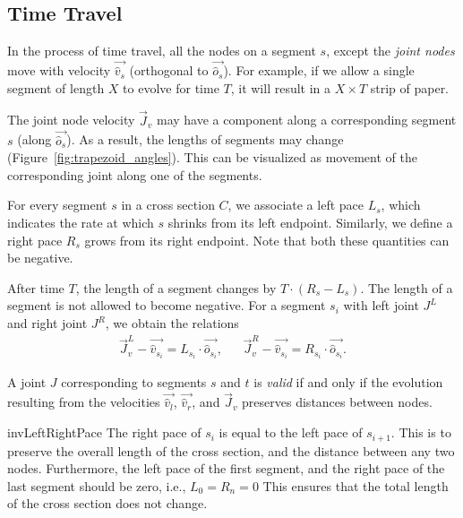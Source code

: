 \subsection{Time Travel}
\label{sec:time_travel}

In the process of time travel, all the nodes on a segment $s$, except the
\emph{joint nodes} move with velocity $\vec{\hat v_s}$ (orthogonal to $\vec{\hat
o_s}$). For example, if we allow a single segment of length $X$ to evolve for
time $T$, it will result in a $X\times T$ strip of paper.

The joint node velocity $\vec J_v$ may have a component along a corresponding
segment $s$ (along $\vec{\hat o_s}$). As a result, the lengths of segments may
change (Figure~\ref{fig:trapezoid_angles}). This can be visualized as movement
of the corresponding joint along one of the segments.

\begin{definition}
\label{def:segment_length}
For every segment $s$ in a cross section $C$, we associate a left pace $L_s$,
which indicates the rate at which $s$ shrinks from its left endpoint.
Similarly, we define a right pace $R_s$ grows from its right endpoint.
Note that both these quantities can be negative.
\end{definition}
After time $T$, the length of a segment changes by $T\cdot(R_s-L_s)$.
The length of a segment is not allowed to become negative.
For a segment $s_i$ with left joint $J^L$ and right joint $J^R$, we obtain the relations
\begin{align*}
\vec J_v^L-\vec{\hat v_{s_i}} = L_{s_i}\cdot \vec{\hat o_{s_i}}, && \vec J_v^R-\vec{\hat v_{s_i}} = R_{s_i}\cdot \vec{\hat o_{s_i}}.
\end{align*}

\begin{definition}
\label{def:valid_joint}
A joint $J$ corresponding to segments $s$ and $t$ is \emph{valid} if and only if the evolution
resulting from the velocities $\vec{\hat v_l}$, $\vec{\hat v_r}$, and $\vec J_v$ preserves distances between nodes.
\end{definition}
\vspace{-1pc}
\begin{restatable}{inv}{LeftRightPace}
\label{inv:left_right_pace}
The right pace of $s_{i}$ is equal to the left pace of $s_{i+1}$.
This is to preserve the overall length of the cross section, and the distance between any two nodes.
Furthermore, the left pace of the first segment, and the right pace of the last segment should be zero, i.e., $L_0 = R_n = 0$
This ensures that the total length of the cross section does not change.
\end{restatable}


